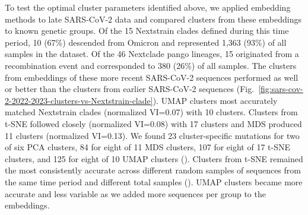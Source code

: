 \documentclass[10pt,letterpaper]{article}
\begin{document}
To test the optimal cluster parameters identified above, we applied embedding methods to late SARS-CoV-2 data and compared clusters from these embeddings to known genetic groups.
Of the 15 Nextstrain clades defined during this time period, 10 (67\%) descended from Omicron and represented 1,363 (93\%) of all samples in the dataset.
Of the 46 Nextclade pango lineages, 15 originated from a recombination event and corresponded to 380 (26\%) of all samples.
The clusters from embeddings of these more recent SARS-CoV-2 sequences performed as well or better than the clusters from earlier SARS-CoV-2 sequences (Fig.~\ref{fig:sars-cov-2-2022-2023-clusters-vs-Nextstrain-clade}).
UMAP clusters most accurately matched Nextstrain clades (normalized VI=0.07) with 10 clusters.
Clusters from t-SNE followed closely (normalized VI=0.08) with 17 clusters and MDS produced 11 clusters (normalized VI=0.13).
We found 23 cluster-specific mutations for two of six PCA clusters, 84 for eight of 11 MDS clusters, 107 for eight of 17 t-SNE clusters, and 125 for eight of 10 UMAP clusters ().
Clusters from t-SNE remained the most consistently accurate across different random samples of sequences from the same time period and different total samples ().
UMAP clusters became more accurate and less variable as we added more sequences per group to the embeddings.
\end{document}

